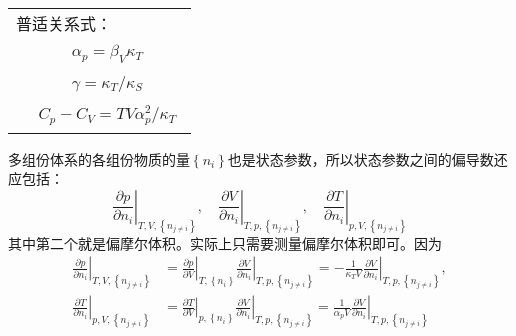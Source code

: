 \documentclass[main.tex]{subfiles}
\begin{document}
\begin{longtable}{m{}m{}}
  \multicolumn{2}{l}{{普适关系式：}}                                                                                                                                                                                                                                                                                              \\
                                               & \begin{align}\alpha_p=\beta_V\kappa_T\end{align}                                                                                                                                                                                                                           \\ [-10ex]
                                               & \begin{align}\gamma=\kappa_T/\kappa_S\end{align}                                                                                                                                                                                                                           \\[-10ex]
                                               & \begin{align}C_p-C_V=TV\alpha_p^2/\kappa_T\end{align}                                                                                                                                                                                                                      \\ [-4ex]

  \hline
\end{longtable}

多组份体系的各组份物质的量$\left\{n_i\right\}$也是状态参数，所以状态参数之间的偏导数还应包括：
\[\left.\frac{\partial p}{\partial n_i}\right|_{T,V,\left\{n_{j\neq i}\right\}},\quad\left.\frac{\partial V}{\partial n_i}\right|_{T,p,\left\{n_{j\neq i}\right\}},\quad\left.\frac{\partial T}{\partial n_i}\right|_{p,V,\left\{n_{j\neq i}\right\}}\]
其中第二个就是偏摩尔体积。实际上只需要测量偏摩尔体积即可。因为
\begin{align*}
  \left.\frac{\partial p}{\partial n_i}\right|_{T,V,\left\{n_{j\neq i}\right\}} & =\left.\frac{\partial p}{\partial V}\right|_{T,\left\{n_i\right\}}\left.\frac{\partial V}{\partial n_i}\right|_{T,p,\left\{n_{j\neq i}\right\}}=-\frac{1}{\kappa_TV}\left.\frac{\partial V}{\partial n_i}\right|_{T,p,\left\{n_{j\neq i}\right\}}, \\
  \left.\frac{\partial T}{\partial n_i}\right|_{p,V,\left\{n_{j\neq i}\right\}} & =\left.\frac{\partial T}{\partial V}\right|_{p,\left\{n_i\right\}}\left.\frac{\partial V}{\partial n_i}\right|_{T,p,\left\{n_{j\neq i}\right\}}=\frac{1}{\alpha_p V}\left.\frac{\partial V}{\partial n_i}\right|_{T,p,\left\{n_{j\neq i}\right\}}
\end{align*}
\end{document}
